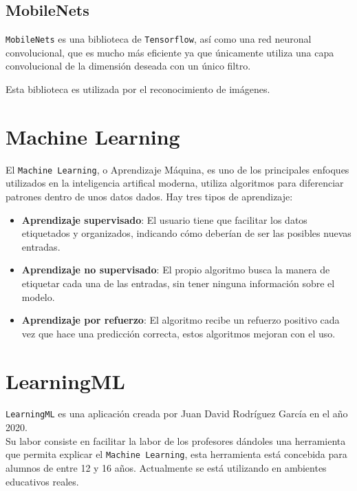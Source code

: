 \documentclass[a4paper, 12pt]{book}
\begin{document}
\subsection{MobileNets}
\label{subsec:mobilenets}

\texttt{MobileNets} es una biblioteca de \texttt{Tensorflow}, así como una red neuronal convolucional, que es mucho más eficiente ya que únicamente utiliza una capa convolucional de la dimensión deseada con un único filtro.

Esta biblioteca es utilizada por el reconocimiento de imágenes.

\section{Machine Learning}
\label{sec:machine-learning}

El \texttt{Machine Learning}\cite{rouhiainen2018inteligencia}, o Aprendizaje Máquina, es uno de los principales enfoques utilizados en la inteligencia artifical moderna, utiliza algoritmos para diferenciar patrones dentro de unos datos dados. Hay tres tipos de aprendizaje:

\begin{itemize}
	\item \textbf{Aprendizaje supervisado}: El usuario tiene que facilitar los datos etiquetados y organizados, indicando cómo deberían de ser las posibles nuevas entradas.
	\item \textbf{Aprendizaje no supervisado}: El propio algoritmo busca la manera de etiquetar cada una de las entradas, sin tener ninguna información sobre el modelo.
	\item \textbf{Aprendizaje por refuerzo}: El algoritmo recibe un refuerzo positivo cada vez que hace una predicción correcta, estos algoritmos mejoran con el uso.
\end{itemize}

\section{LearningML}
\label{sec:learningml}

\texttt{LearningML} es una aplicación creada por Juan David Rodríguez García en el año 2020.\\
Su labor consiste en facilitar la labor de los profesores dándoles una herramienta que permita explicar el \texttt{Machine Learning}, esta herramienta está concebida para alumnos de entre 12 y 16 años. Actualmente se está utilizando en ambientes educativos reales.
\end{document}

